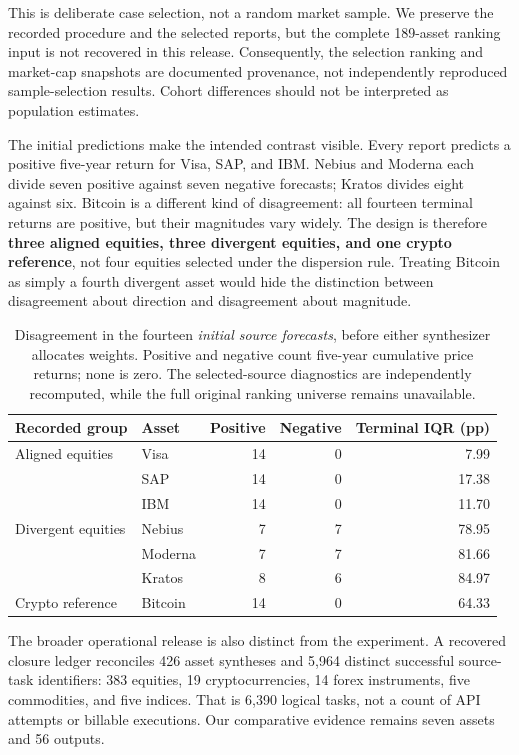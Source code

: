 \documentclass[11pt]{article}
\begin{document}
This is deliberate case selection, not a random market sample. We preserve the recorded procedure and the selected reports, but the complete 189-asset ranking input is not recovered in this release. Consequently, the selection ranking and market-cap snapshots are documented provenance, not independently reproduced sample-selection results. Cohort differences should not be interpreted as population estimates.

The initial predictions make the intended contrast visible. Every report predicts a positive five-year return for Visa, SAP, and IBM. Nebius and Moderna each divide seven positive against seven negative forecasts; Kratos divides eight against six. Bitcoin is a different kind of disagreement: all fourteen terminal returns are positive, but their magnitudes vary widely. The design is therefore \textbf{three aligned equities, three divergent equities, and one crypto reference}, not four equities selected under the dispersion rule. Treating Bitcoin as simply a fourth divergent asset would hide the distinction between disagreement about direction and disagreement about magnitude.

\begin{table}[ht]
\centering\small
\begin{tabular}{@{}llrrr@{}}
\toprule
Recorded group & Asset & Positive & Negative & Terminal IQR (pp) \\
\midrule
Aligned equities & Visa & 14 & 0 & 7.99 \\
& SAP & 14 & 0 & 17.38 \\
& IBM & 14 & 0 & 11.70 \\
\addlinespace
Divergent equities & Nebius & 7 & 7 & 78.95 \\
& Moderna & 7 & 7 & 81.66 \\
& Kratos & 8 & 6 & 84.97 \\
\addlinespace
Crypto reference & Bitcoin & 14 & 0 & 64.33 \\
\bottomrule
\end{tabular}
\caption{Disagreement in the fourteen \emph{initial source forecasts}, before either synthesizer allocates weights. Positive and negative count five-year cumulative price returns; none is zero. The selected-source diagnostics are independently recomputed, while the full original ranking universe remains unavailable.}
\label{tab:initial}
\end{table}

The broader operational release is also distinct from the experiment. A recovered closure ledger reconciles 426 asset syntheses and 5,964 distinct successful source-task identifiers: 383 equities, 19 cryptocurrencies, 14 forex instruments, five commodities, and five indices. That is 6,390 logical tasks, not a count of API attempts or billable executions. Our comparative evidence remains seven assets and 56 outputs.
\end{document}
